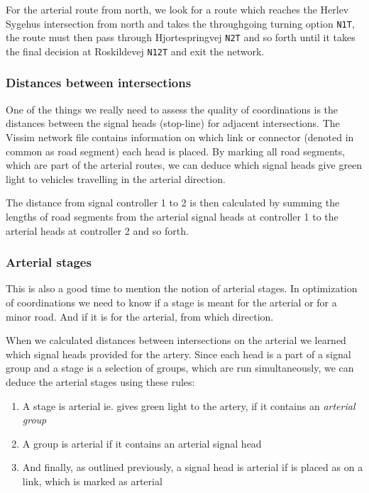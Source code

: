 For the arterial route from north, we look for a route which reaches the Herlev Sygehus intersection from north and takes the throughgoing turning option \verb|N1T|, the route must then pass through Hjortespringvej \verb|N2T| and so forth until it takes the final decision at Roskildevej \verb|N12T| and exit the network.

\subsubsection*{Distances between intersections}
One of the things we really need to assess the quality of coordinations is the distances between the signal heads (stop-line) for adjacent intersections. The Vissim network file contains information on which link or connector (denoted in common as road segment) each head is placed. By marking all road segments, which are part of the arterial routes, we can deduce which signal heads give green light to vehicles travelling in the arterial direction.

The distance from signal controller 1 to 2 is then calculated by summing the lengths of road segments from the arterial signal heads at controller 1 to the arterial heads at controller 2 and so forth.

\subsubsection*{Arterial stages}
This is also a good time to mention the notion of arterial stages. In optimization of coordinations we need to know if a stage is meant for the arterial or for a minor road. And if it is for the arterial, from which direction.

When we calculated distances between intersections on the arterial we learned which signal heads provided for the artery. Since each head is a part of a signal group and a stage is a selection of groups, which are run simultaneously, we can deduce the arterial stages using these rules:

\begin{enumerate}
\item A stage is arterial ie. gives green light to the artery, if it contains an \textit{arterial group}
\item A group is arterial if it contains an arterial signal head
\item And finally, as outlined previously, a signal head is arterial if is placed as on a link, which is marked as arterial
\end{enumerate}


